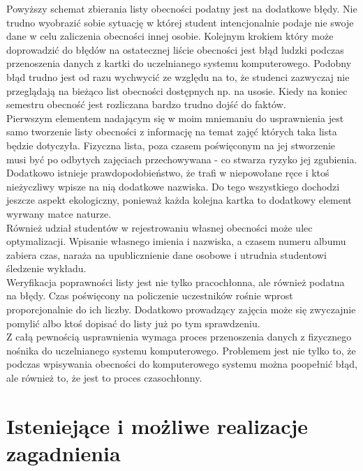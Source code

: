 \documentclass[declaration,shortabstract, mgr]{iithesis}
\begin{document}
\indent Powyższy schemat zbierania listy obecności podatny jest na dodatkowe błędy. Nie trudno wyobrazić sobie sytuację w której student intencjonalnie podaje nie swoje dane w celu zaliczenia obecności innej osobie. Kolejnym krokiem który może doprowadzić do błędów na ostatecznej liście obecności jest błąd ludzki podczas przenoszenia danych z kartki do uczelnianego systemu komputerowego. Podobny błąd trudno jest od razu wychwycić ze względu na to, że studenci zazwyczaj nie przeglądają na bieżąco list obecności dostępnych np. na usosie. Kiedy na koniec semestru obecność jest rozliczana bardzo trudno dojść do faktów.\\
\indent Pierwszym elementem nadającym się w moim mniemaniu do usprawnienia jest samo tworzenie listy obecności z informację na temat zajęć których taka lista będzie dotyczyła. Fizyczna lista, poza czasem poświęconym na jej stworzenie musi być po odbytych zajęciach przechowywana - co stwarza ryzyko jej zgubienia. Dodatkowo istnieje prawdopodobieństwo, że trafi w niepowołane ręce i ktoś nieżyczliwy wpisze na nią dodatkowe nazwiska. Do tego wszystkiego dochodzi jeszcze aspekt ekologiczny, ponieważ każda kolejna kartka to dodatkowy element wyrwany matce naturze. \\
\indent Również udział studentów w rejestrowaniu własnej obecności może ulec optymalizacji. Wpisanie własnego imienia i nazwiska, a czasem numeru albumu zabiera czas, naraża na upublicznienie dane osobowe i utrudnia studentowi śledzenie wykładu.\\
\indent Weryfikacja poprawności listy jest nie tylko pracochłonna, ale również podatna na błędy. Czas poświęcony na policzenie uczestników rośnie wprost proporcjonalnie do ich liczby. Dodatkowo prowadzący zajęcia może się zwyczajnie pomylić albo ktoś dopisać do listy już po tym sprawdzeniu.\\
\indent Z całą pewnością usprawnienia wymaga proces przenoszenia danych z fizycznego nośnika do uczelnianego systemu komputerowego. Problemem jest nie tylko to, że podczas wpisywania obecności do komputerowego systemu można poopełnić błąd, ale również to, że jest to proces czasochłonny.\\

\section{Isteniejące i możliwe realizacje zagadnienia}
\end{document}
